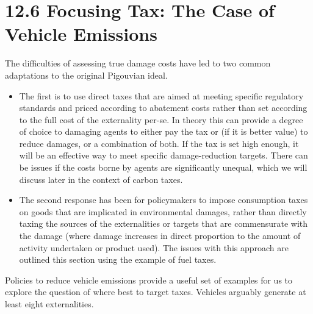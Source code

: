 \documentclass[]{tufte-handout}
\begin{document}
\hypertarget{focusing-tax-the-case-of-vehicle-emissions}{%
\section{12.6 Focusing Tax: The Case of Vehicle
Emissions}\label{focusing-tax-the-case-of-vehicle-emissions}}

The difficulties of assessing true damage costs have led to two common
adaptations to the original Pigouvian ideal.

\begin{itemize}
\item
  The first is to use direct taxes that are aimed at meeting specific
  regulatory standards and priced according to abatement costs rather
  than set according to the full cost of the externality per-se. In
  theory this can provide a degree of choice to damaging agents to
  either pay the tax or (if it is better value) to reduce damages, or a
  combination of both. If the tax is set high enough, it will be an
  effective way to meet specific damage-reduction targets. There can be
  issues if the costs borne by agents are significantly unequal, which
  we will discuss later in the context of carbon taxes.
\item
  The second response has been for policymakers to impose consumption
  taxes on goods that are implicated in environmental damages, rather
  than directly taxing the sources of the externalities or targets that
  are commensurate with the damage (where damage increases in direct
  proportion to the amount of activity undertaken or product used). The
  issues with this approach are outlined this section using the example
  of fuel taxes.
\end{itemize}

Policies to reduce vehicle emissions provide a useful set of examples
for us to explore the question of where best to target taxes. Vehicles
arguably generate at least eight externalities.
\end{document}
